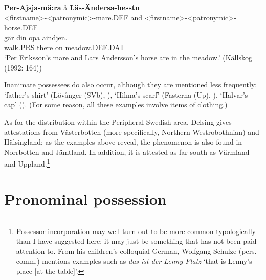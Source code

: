 

 \ea\label{}
\gll \textbf{Per-Ajsja-mä:ra} å  \textbf{Läs-Ändersa-hesstn}\\


{\textless}firstname{\textgreater}-{\textless}patronymic{\textgreater}-mare.DEF  and  {\textless}firstname{\textgreater}-{\textless}patronymic{\textgreater}-horse.DEF\\

 \ea\label{}
\gll gär  din  opa  aindjen.\\


walk.PRS  there  on  meadow.DEF.DAT\\

\glt ‘Per Eriksson’s mare and Lars Andersson’s horse are in the meadow.’ (Källskog (1992: 164))

\z

Inanimate possessees do also occur, although they are mentioned less frequently:  ‘father’s shirt’ (Lövånger (SVb), \citet{Holm1942}),  ‘Hilma’s scarf’ (Fasterna (Up), \citet[134]{Tiselius1902}),  ‘Halvar’s cap’ (\citet{Oscarsson2007}). (For some reason, all these examples involve items of clothing.)


As for the distribution within the Peripheral Swedish area, Delsing gives attestations from Västerbotten (more specifically, Northern Westrobothnian) and Hälsingland; as the examples above reveal, the phenomenon is also found in Norrbotten and Jämtland. In addition, it is attested as far south as Värmland and Uppland.\footnote{ Possessor incorporation may well turn out to be more common typologically than I have suggested here; it may just be something that has not been paid attention to. From his children’s colloquial German, Wolfgang Schulze (pers. comm.) mentions examples such as \textit{das ist der Lenny-Platz} ‘that is Lenny’s place [at the table]’.\par }


\section{\rmfamily Pronominal possession}

